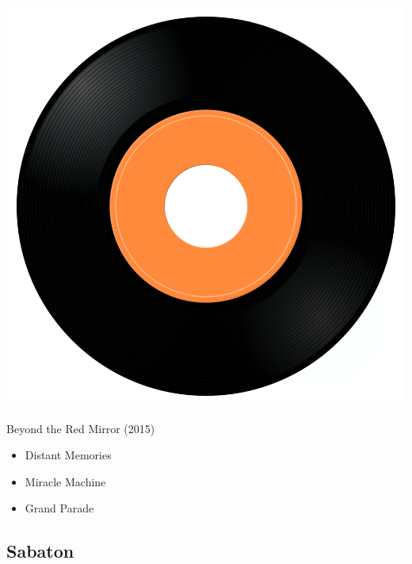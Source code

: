 \begin{minipage}[t]{0.25\textwidth}
\captionsetup{type=figure}
\includegraphics[width=\textwidth]{Images/cover.png}
\caption*{Beyond the Red Mirror (2015)}
\end{minipage}
\begin{minipage}[t]{0.25\textwidth}\vspace{0pt}
\begin{itemize}[nosep,leftmargin=1em,labelwidth=*,align=left]
	\setlength{\itemsep}{0pt}
	\item Distant Memories
	\item Miracle Machine
	\item Grand Parade
\end{itemize}
\end{minipage}

\subsection{Sabaton}

